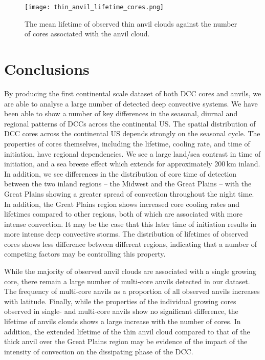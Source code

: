 \begin{figure}[t]
    \centering
    \texttt{[image: thin\_anvil\_lifetime\_cores.png]}
    \caption{The mean lifetime of observed thin anvil clouds against the number of cores associated with the anvil cloud.}
    \label{fig:thin_anvil_lifetime_by_core}
\end{figure}


\section{Conclusions}  %

By producing the first continental scale dataset of both DCC cores and anvils, we are able to analyse a large number of detected deep convective systems.
We have been able to show a number of key differences in the seasonal, diurnal and regional patterns of DCCs across the continental US.
The spatial distribution of DCC cores across the continental US depends strongly on the seasonal cycle.
The properties of cores themselves, including the lifetime, cooling rate, and time of initiation, have regional dependencies.
We see a large land/sea contrast in time of initiation, and a sea breeze effect which extends for approximately 200\,\unit{km} inland.
In addition, we see differences in the distribution of core time of detection between the two inland regions -- the Midwest and the Great Plains -- with the Great Plains showing a greater spread of convection throughout the night time.
In addition, the Great Plains region shows increased core cooling rates and lifetimes compared to other regions, both of which are associated with more intense convection.
It may be the case that this later time of initiation results in more intense deep convective storms.
The distribution of lifetimes of observed cores shows less difference between different regions, indicating that a number of competing factors may be controlling this property.

While the majority of observed anvil clouds are associated with a single growing core, there remain a large number of multi-core anvils detected in our dataset.
The frequency of multi-core anvils as a proportion of all observed anvils increases with latitude.
Finally, while the properties of the individual growing cores observed in single- and multi-core anvils show no significant difference, the lifetime of anvils clouds shows a large increase with the number of cores.
In addition, the extended lifetime of the thin anvil cloud compared to that of the thick anvil over the Great Plains region may be evidence of the impact of the intensity of convection on the dissipating phase of the DCC.

